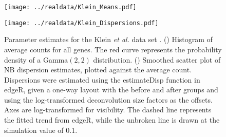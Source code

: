 \documentclass{article}
\begin{document}
\begin{figure}[btp]
    \begin{center}
        \begin{minipage}{0.4\textwidth}
            \texttt{[image: ../realdata/Klein\_Means.pdf]}
            \subcaption{}\label{subfig:kleinmean}
        \end{minipage}
        \begin{minipage}{0.4\textwidth}
            \texttt{[image: ../realdata/Klein\_Dispersions.pdf]}
            \subcaption{}\label{subfig:kleindisp}
        \end{minipage}
    \end{center}
    \caption{
        Parameter estimates for the Klein \textit{et al.} data set \cite{klein2015droplet}.
        () Histogram of average counts for all genes. 
        The red curve represents the probability density of a Gamma$(2, 2)$ distribution.
        () Smoothed scatter plot of NB dispersion estimates, plotted against the average count.
        Dispersions were estimated using the estimateDisp function in edgeR, given a one-way layout with the before and after groups and using the log-transformed deconvolution size factors as the offsets.
        Axes are log-transformed for visibility.
        The dashed line represents the fitted trend from edgeR, while the unbroken line is drawn at the simulation value of 0.1.
    }
\end{figure}
\end{document}

